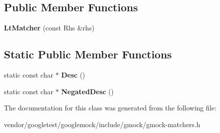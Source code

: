 \subsection*{Public Member Functions}
\begin{DoxyCompactItemize}
\item 
{\bfseries Lt\+Matcher} (const Rhs \&rhs)\hypertarget{classtesting_1_1internal_1_1LtMatcher_af5275d78fc5499e4757f1b3ecca67e15}{}\label{classtesting_1_1internal_1_1LtMatcher_af5275d78fc5499e4757f1b3ecca67e15}

\end{DoxyCompactItemize}
\subsection*{Static Public Member Functions}
\begin{DoxyCompactItemize}
\item 
static const char $\ast$ {\bfseries Desc} ()\hypertarget{classtesting_1_1internal_1_1LtMatcher_aeb101aafbf1c074ccbb3df1496487746}{}\label{classtesting_1_1internal_1_1LtMatcher_aeb101aafbf1c074ccbb3df1496487746}

\item 
static const char $\ast$ {\bfseries Negated\+Desc} ()\hypertarget{classtesting_1_1internal_1_1LtMatcher_ab62db503e9e0293b4a2d22a96c140b10}{}\label{classtesting_1_1internal_1_1LtMatcher_ab62db503e9e0293b4a2d22a96c140b10}

\end{DoxyCompactItemize}


The documentation for this class was generated from the following file\+:\begin{DoxyCompactItemize}
\item 
vendor/googletest/googlemock/include/gmock/gmock-\/matchers.\+h\end{DoxyCompactItemize}
